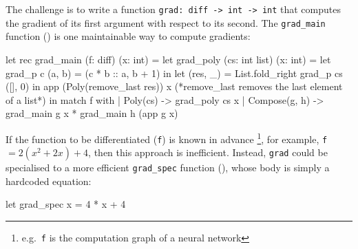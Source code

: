The challenge is to write a function \texttt{grad: diff -> int -> int} that computes the gradient of its first argument with respect to its second. The \texttt{grad_main} function () is one maintainable way to compute gradients: 

\begin{code}
\begin{ocamllst}
let rec grad_main (f: diff) (x: int) = 
  let grad_poly (cs: int list) (x: int) = 
    let grad_p c (a, b) = (c * b :: a, b + 1) in
    let (res, _) = List.fold_right grad_p cs ([], 0) in 
    app (Poly(remove_last res)) x (*remove_last removes the last element of a list*)
  in match f with
    | Poly(cs)      -> grad_poly cs x
    | Compose(g, h) -> grad_main g x * grad_main h (app g x)

\end{ocamllst}
%
\label{listing:ocaml-grad-main}
\end{code}


If the function to be differentiated (\texttt{f}) is known in advance \footnote{e.g.\ \texttt{f} is the computation graph of a neural network}, for example, \texttt{f} $= 2(x^2 + 2x) + 4$, then this approach is inefficient. Instead, \texttt{grad} could be specialised to a more efficient \texttt{grad_spec} function (), whose body is simply a hardcoded equation:

\begin{code}
\begin{ocamllst}
let grad_spec x = 4 * x + 4
\end{ocamllst}
\label{listing:ocaml-grad-fast}
\end{code}    

